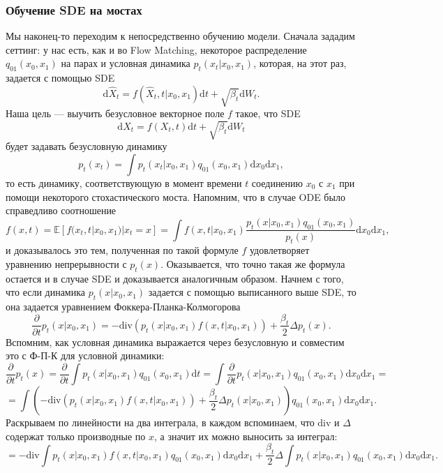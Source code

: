 \documentclass[12pt]{article}
\theoremstyle{definition}
\begin{document}
\subsubsection{Обучение SDE на мостах}
Мы наконец-то переходим к непосредственно обучению модели. Сначала зададим сеттинг: у нас есть, как и во Flow Matching, некоторое распределение $q_{01}(x_0, x_1)$ на парах и условная динамика $p_t(x_t | x_0, x_1)$, которая, на этот раз, задается с помощью SDE
\[
    \mathrm{d} \hat{X}_t = f(\hat{X}_t, t | x_0, x_1) \mathrm{d} t + \sqrt{\beta_t} \mathrm{d} W_t.
\]
Наша цель --- выучить безусловное векторное поле $f$ такое, что SDE
\[
    \mathrm{d} X_t = f(X_t, t) \mathrm{d} t + \sqrt{\beta_t} \mathrm{d} W_t
\]
будет задавать безусловную динамику
\[
    p_t(x_t) = \int p_t(x_t | x_0, x_1) q_{01}(x_0, x_1) \mathrm{d}x_0 \mathrm{d}x_1,
\]
то есть динамику, соответствующую в момент времени $t$ соединению $x_0$ с $x_1$ при помощи некоторого стохастического моста. Напомним, что в случае ODE было справедливо соотношение
\[
    f(x, t) = \mathbb{E}\left[f(x_t, t | x_0, x_1) | x_t = x \right] = \int f(x, t | x_0, x_1) \frac{p_t(x | x_0, x_1)q_{01}(x_0, x_1)}{p_t(x)} \mathrm{d} x_0 \mathrm{d} x_1,
\]
и доказывалось это тем, полученная по такой формуле $f$ удовлетворяет уравнению непрерывности с $p_t(x)$. Оказывается, что точно такая же формула остается и в случае SDE и доказывается аналогичным образом. Начнем с того, что если динамика $p_t(x | x_0, x_1)$ задается с помощью выписанного выше SDE, то она задается уравнением Фоккера-Планка-Колмогорова
\[
    \frac{\partial}{\partial t} p_t(x | x_0, x_1) = - \text{div} \left(p_t(x | x_0, x_1) f(x, t | x_0, x_1) \right) + \frac{\beta_t}{2} \Delta p_t(x).
\]
Вспомним, как условная динамика выражается через безусловную и совместим это с Ф-П-К для условной динамики:
\[
    \frac{\partial}{\partial t}p_t(x) = \frac{\partial}{\partial t} \int p_t(x | x_0, x_1) q_{01}(x_0, x_1) \mathrm{d} t = \int  \frac{\partial}{\partial t} p_t(x | x_0, x_1) q_{01}(x_0, x_1) \mathrm{d}x_0 \mathrm{d}x_1 = 
\]
\[
    = \int \left(- \text{div}\left(p_t(x | x_0, x_1) f(x, t | x_0, x_1) \right) + \frac{\beta_t}{2} \Delta p_t(x | x_0, x_1) \right) q_{01}(x_0, x_1)\mathrm{d}x_0\mathrm{d}x_1.
\]
Раскрываем по линейности на два интеграла, в каждом вспоминаем, что $\text{div}$ и $\Delta$ содержат только производные по $x$, а значит их можно выносить за интеграл:
\[
    = -\text{div}\int p_t(x | x_0, x_1) f(x, t | x_0, x_1) q_{01}(x_0, x_1) \mathrm{d} x_0 \mathrm{d} x_1 + \frac{\beta_t}{2} \Delta \int p_t(x | x_0, x_1) q_{01}(x_0, x_1) \mathrm{d} x_0 \mathrm{d} x_1.
\]
\end{document}

